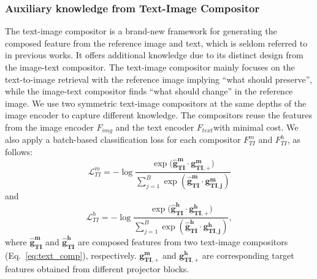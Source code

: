 \documentclass[sigconf]{acmart}
\begin{document}
\subsubsection{Auxiliary knowledge from Text-Image Compositor}

The text-image compositor is a brand-new framework for generating the composed feature from the reference image and text, which is seldom referred to in previous works. It offers additional knowledge due to its distinct design from the image-text compositor. The text-image compositor mainly focuses on the text-to-image retrieval with the reference image implying ``what should preserve'', while the image-text compositor finds ``what should change'' in the reference image. We use two symmetric text-image compositors at the same depths of the image encoder to capture different knowledge. The compositors reuse the features from the image encoder $F_{img}$ and the text encoder $F_{text}$with minimal cost. We also apply a batch-based classification loss for each compositor $F^m_{TI}$ and $F^h_{TI}$, as follows:
\begin{equation}
\label{eq:losstim}
    \mathcal{L}_{TI}^m = -\log\frac{\exp(\bm{\hat{g}_{TI}^m} \cdot \bm{g_{TI,+}^m)}}{\sum_{j=1}^{B}\exp(\bm{\hat{g}_{TI}^m} \cdot \bm{g_{TI, j}^m} )}
\end{equation}
and
\begin{equation}
\label{eq:losstih}
    \mathcal{L}_{TI}^h = -\log\frac{\exp(\bm{\hat{g}_{TI}^h} \cdot \bm{g_{TI,+}^h)}}{\sum_{j=1}^{B}\exp(\bm{\hat{g}_{TI}^h} \cdot \bm{g_{TI, j}^h} )},
\end{equation}
where $\bm{\hat{g}_{TI}^m}$ and $\bm{\hat{g}_{TI}^h}$ are composed features from two text-image compositors (Eq.~\ref{eq:text_comp}), respectively. $\bm{g_{TI,+}^m}$ and $\bm{g_{TI,+}^h}$ are corresponding target features obtained from different projector blocks. 
\end{document}
